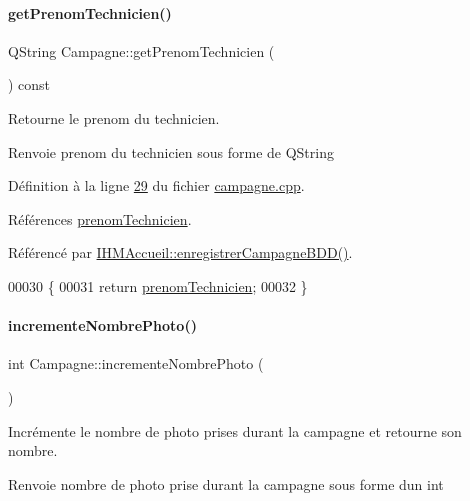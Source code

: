 \paragraph{\texorpdfstring{get\+Prenom\+Technicien()}{getPrenomTechnicien()}}
{\footnotesize\ttfamily Q\+String Campagne\+::get\+Prenom\+Technicien (\begin{DoxyParamCaption}{ }\end{DoxyParamCaption}) const}



Retourne le prenom du technicien. 

\begin{DoxyReturn}{Renvoie}
prenom du technicien sous forme de Q\+String 
\end{DoxyReturn}


Définition à la ligne \hyperlink{campagne_8cpp_source_l00029}{29} du fichier \hyperlink{campagne_8cpp_source}{campagne.\+cpp}.



Références \hyperlink{campagne_8h_source_l00040}{prenom\+Technicien}.



Référencé par \hyperlink{ihmaccueil_8cpp_source_l00273}{I\+H\+M\+Accueil\+::enregistrer\+Campagne\+B\+D\+D()}.


\begin{DoxyCode}
00030 \{
00031     \textcolor{keywordflow}{return} \hyperlink{class_campagne_a9cc37c9671136683b5dac87ff34017bc}{prenomTechnicien};
00032 \}
\end{DoxyCode}
\mbox{\label{class_campagne_ab6a893a28bc18e054d2d19d2671ce6da}} 
\paragraph{\texorpdfstring{incremente\+Nombre\+Photo()}{incrementeNombrePhoto()}}
{\footnotesize\ttfamily int Campagne\+::incremente\+Nombre\+Photo (\begin{DoxyParamCaption}{ }\end{DoxyParamCaption})}



Incrémente le nombre de photo prises durant la campagne et retourne son nombre. 

\begin{DoxyReturn}{Renvoie}
nombre de photo prise durant la campagne sous forme d\textquotesingle{}un int 
\end{DoxyReturn}


